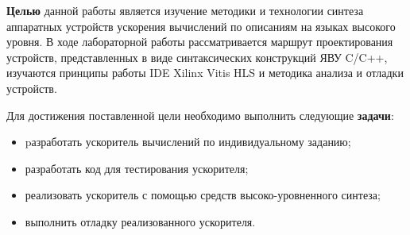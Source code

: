 \Introduction

\textbf{Целью} данной работы является изучение методики и технологии синтеза
аппаратных устройств ускорения вычислений по описаниям на языках высокого
уровня. В ходе лабораторной работы рассматривается маршрут проектирования
устройств, представленных в виде синтаксических конструкций ЯВУ C/C++,
изучаются принципы работы IDE Xilinx Vitis HLS и методика анализа и отладки
устройств.

Для достижения поставленной цели необходимо выполнить следующие \textbf{задачи}:

\begin{itemize}
	\item pазработать ускоритель вычислений по
индивидуальному заданию;
	\item разработать код для тестирования ускорителя;
	\item
реализовать ускоритель с помощью средств высоко-уровненного синтеза;
	\item
выполнить отладку реализованного ускорителя.
\end{itemize}
